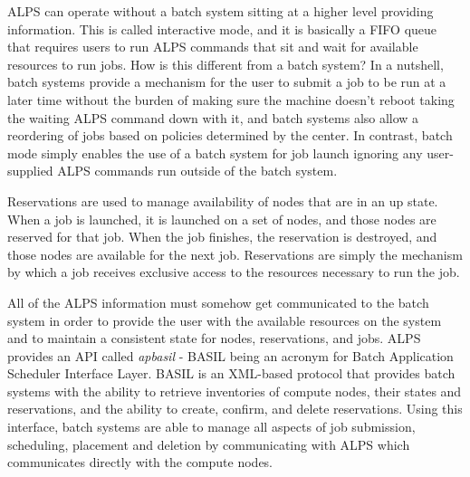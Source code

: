 ALPS can operate without a batch system sitting at a higher level providing
information.  This is called interactive mode, and it is basically a FIFO queue
that requires users to run ALPS commands that sit and wait for available
resources to run jobs.  How is this different from a batch system?  In a
nutshell, batch systems provide a mechanism for the user to submit a job to be
run at a later time without the burden of making sure the machine doesn't
reboot taking the waiting ALPS command down with it, and batch systems also
allow a reordering of jobs based on policies determined by the center.  In
contrast, batch mode simply enables the use of a batch system for job launch
ignoring any user-supplied ALPS commands run outside of the batch system.

Reservations are used to manage availability of nodes that are in an up state.
When a job is launched, it is launched on a set of nodes, and those nodes are
reserved for that job.  When the job finishes, the reservation is destroyed,
and those nodes are available for the next job.  Reservations are simply the
mechanism by which a job receives exclusive access to the resources necessary
to run the job.

All of the ALPS information must somehow get communicated to the batch system
in order to provide the user with the available resources on the system and to
maintain a consistent state for nodes, reservations, and jobs.  ALPS provides
an API called \emph{apbasil} - BASIL being an acronym for Batch Application
Scheduler Interface Layer.  BASIL is an XML-based protocol that provides batch
systems with the ability to retrieve inventories of compute nodes, their states
and reservations, and the ability to create, confirm, and delete reservations.
Using this interface, batch systems are able to manage all aspects of job
submission, scheduling, placement and deletion by communicating with ALPS which
communicates directly with the compute nodes.
